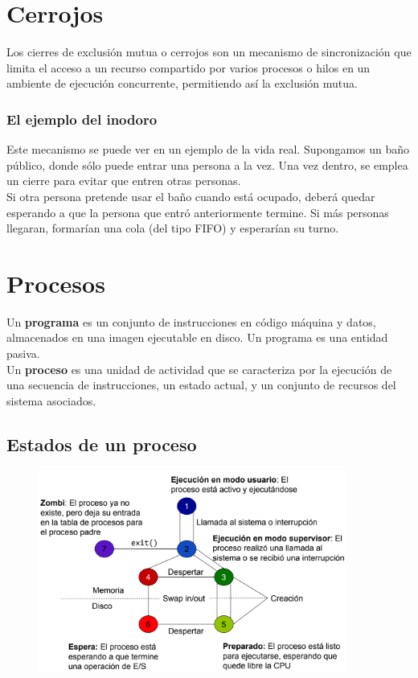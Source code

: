 \vspace{3cm}
\section{Cerrojos}
Los cierres de exclusión mutua o cerrojos son un mecanismo de sincronización que limita el acceso a un recurso compartido por varios procesos o hilos en un ambiente de ejecución concurrente, permitiendo así la exclusión mutua.

\subsubsection{El ejemplo del inodoro}
Este mecanismo se puede ver en un ejemplo de la vida real. Supongamos un baño público, donde sólo puede entrar una persona a la vez. Una vez dentro, se emplea un cierre para evitar que entren otras personas.\\

Si otra persona pretende usar el baño cuando está ocupado, deberá quedar esperando a que la persona que entró anteriormente termine. Si más personas llegaran, formarían una cola (del tipo FIFO) y esperarían su turno.
\newpage
\section{Procesos}
Un \textbf{programa} es un conjunto de instrucciones en código máquina y datos, almacenados en una imagen ejecutable en disco. Un programa es una entidad pasiva.\\

Un \textbf{proceso} es una unidad de actividad que se caracteriza por la ejecución de una secuencia de instrucciones, un estado actual, y un conjunto de recursos del sistema asociados.
\subsection{Estados de un proceso}
\begin{figure}[H]
\centering \includegraphics[width=0.9\textwidth]{img/ProcesEstados.png}
\end{figure}

